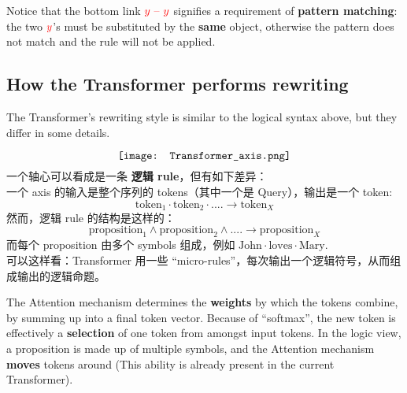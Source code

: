 Notice that the bottom link ${\color{red}y \mbox{ -- } y}$ signifies a requirement of \textbf{pattern matching}: the two ${\color{red}y}$'s must be substituted by the \textbf{same} object, otherwise the pattern does not match and the rule will not be applied.

\subsection{How the Transformer performs rewriting}

The Transformer's rewriting style is similar to the logical syntax above, but they differ in some details.

\begin{equation}
\vcenter{\hbox{\texttt{[image: Transformer\_axis.png]}}}
\end{equation}
一个轴心可以看成是一条 \textbf{逻辑 rule}，但有如下差异：\\
一个 axis 的输入是整个序列的 tokens（其中一个是 Query），输出是一个 token:
\begin{equation}
\mbox{token}_1 \cdot \mbox{token}_2 \cdot .... \rightarrow \mbox{token}_{X}
\end{equation}
然而，逻辑 rule 的结构是这样的：
\begin{equation}
\mbox{proposition}_1 \wedge \mbox{proposition}_2 \wedge .... \rightarrow \mbox{proposition}_{X}
\end{equation}
而每个 proposition 由多个 symbols 组成，例如 $ \mbox{John} \cdot \mbox{loves} \cdot \mbox{Mary} $. \\
可以这样看：Transformer 用一些 ``micro-rules''，每次输出一个逻辑符号，从而组成输出的逻辑命题。 

The Attention mechanism determines the \textbf{weights} by which the tokens combine, by summing up into a final token vector.  Because of ``softmax'', the new token is effectively a \textbf{selection} of one token from amongst input tokens.  In the logic view, a proposition is made up of multiple symbols, and the Attention mechanism \textbf{moves} tokens around (This ability is already present in the current Transformer).


